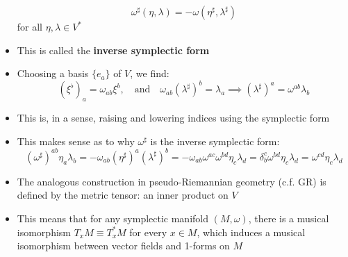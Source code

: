 \documentclass[12pt,a4paper]{article}
\numberwithin{equation}{section}
\begin{document}
\begin{itemize}
\begin{equation}
			\omega^{\sharp}(\eta,\lambda)=-\omega(\eta^{\sharp},\lambda^{\sharp})
		\end{equation}
		for all $\eta,\lambda\in V^{*}$
		\item This is called the \textbf{inverse symplectic form}
		\item Choosing a basis $\{e_{a}\}$ of $V$, we find:
		\begin{equation}
			(\xi^{\flat})_{a}=\omega_{ab}\xi^{b},\quad\text{and}\quad \omega_{ab}(\lambda^{\sharp})^{b}=\lambda_{a}\implies (\lambda^{\sharp})^{a}=\omega^{ab}\lambda_{b}
		\end{equation}
		\item This is, in a sense, raising and lowering indices using the symplectic form
		\item This makes sense as to why $\omega^{\sharp}$ is the inverse symplectic form:
		\begin{equation}
			(\omega^{\sharp})^{ab}\eta_{a}\lambda_{b}=-\omega_{ab}(\eta^{\sharp})^{a}(\lambda^{\sharp})^{b}=-\omega_{ab}\omega^{ac}\omega^{bd}\eta_{c}\lambda_{d}=\delta^{c}_{b}\omega^{bd}\eta_{c}\lambda_{d}=\omega^{cd}\eta_{c}\lambda_{d}
		\end{equation}
		\item The analogous construction in pseudo-Riemannian geometry (c.f. GR) is defined by the metric tensor: an inner product on $V$
		\item This means that for any symplectic manifold $(M,\omega)$, there is a musical isomorphism $T_{x}M\equiv T_{x}^{*}M$ for every $x\in M$, which induces a musical isomorphism between vector fields and 1-forms on $M$
	\end{itemize}
\end{document}
